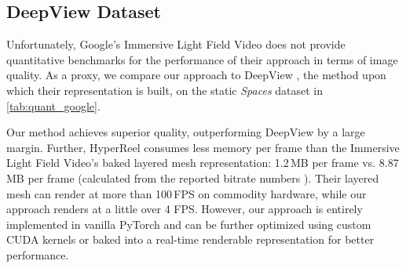 \documentclass[10pt,twocolumn,letterpaper]{article}
\begin{document}
\subsection{DeepView Dataset}

Unfortunately, Google's Immersive Light Field Video \cite{BroxtFOEHDDBWD2020} does not provide quantitative benchmarks for the performance of their approach in terms of image quality.
As a proxy, we compare our approach to DeepView \cite{FlynnBDDFOST2019}, the method upon which their representation is built, on the static \textit{Spaces} dataset in \cref{tab:quant_google}.

Our method achieves superior quality, outperforming DeepView by a large margin.
Further, HyperReel consumes less memory per frame than the Immersive Light Field Video's baked layered mesh representation: 1.2\,MB per frame vs. 8.87\,MB per frame (calculated from the reported bitrate numbers \cite{BroxtFOEHDDBWD2020}).
Their layered mesh can render at more than 100\,FPS on commodity hardware, while our approach renders at a little over 4 FPS.
However, our approach is entirely implemented in vanilla PyTorch and can be further optimized using custom CUDA kernels or baked into a real-time renderable representation for better performance.
\end{document}
